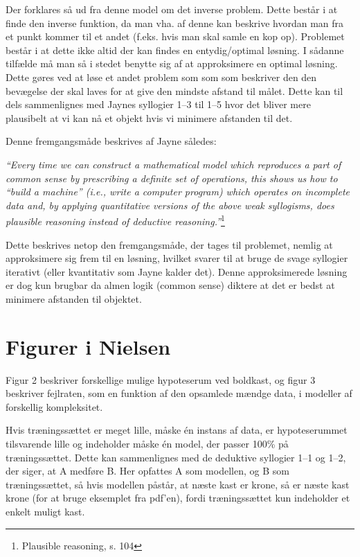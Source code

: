 \documentclass[10pt,a4paper]{article}
\newcommand{\citat}[2]{\begin{justify}\textit{``#1''}\hspace{0.1cm}\footnote{#2}\end{justify}}
\begin{document}
Der forklares så ud fra denne model om det inverse problem. Dette består i at finde den inverse funktion, da man vha. af denne kan beskrive hvordan man fra et punkt kommer til et andet (f.eks. hvis man skal samle en kop op). Problemet består i at dette ikke altid der kan findes en entydig/optimal løsning. I sådanne tilfælde må man så i stedet benytte sig af at approksimere en optimal løsning. Dette gøres ved at løse et andet problem som som som beskriver den den bevægelse der skal laves for at give den mindste afstand til målet. Dette kan til dels sammenlignes med Jaynes syllogier 1--3 til 1--5 hvor det bliver mere plausibelt at vi kan nå et objekt hvis vi minimere afstanden til det.

Denne fremgangsmåde beskrives af Jayne således:
\citat{Every time we can construct a mathematical model which reproduces a part of common sense by prescribing a definite set of operations, this shows us how to ``build a machine'' (i.e., write a computer program) which operates on incomplete data and, by applying quantitative versions of the above weak syllogisms, does plausible reasoning instead of deductive reasoning.}{Plausible reasoning, s. 104}

Dette beskrives netop den fremgangsmåde, der tages til problemet, nemlig at approksimere sig frem til en løsning, hvilket svarer til at bruge de svage syllogier iterativt (eller kvantitativ som Jayne kalder det). Denne approksimerede løsning er dog kun brugbar da almen logik (common sense) diktere at det er bedst at minimere afstanden til objektet.



\section{Figurer i Nielsen}
Figur 2 beskriver forskellige mulige hypoteserum ved boldkast, og figur 3 beskriver fejlraten, som en funktion af den opsamlede mændge data, i modeller af forskellig kompleksitet.

Hvis træningssættet er meget lille, måske én instans af data, er hypoteserummet tilsvarende lille og indeholder måske én model, der passer 100\% på træningssættet. Dette kan sammenlignes med de deduktive syllogier 1--1 og 1--2, der siger, at A medføre B. Her opfattes A som modellen, og B som træningssættet, så hvis modellen påstår, at næste kast er krone, så er næste kast krone (for at bruge eksemplet fra pdf'en), fordi træningssættet kun indeholder et enkelt muligt kast.
\end{document}
